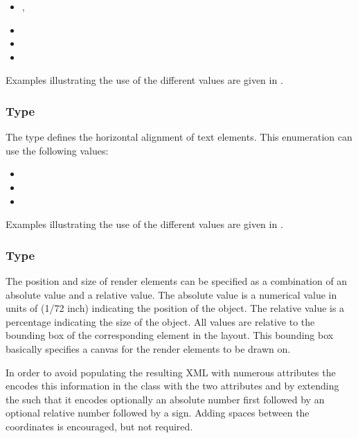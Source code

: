 \begin{itemize}
 \item {},
 \item {}
 \item {} 
 \item {}
\end{itemize}

Examples illustrating the use of the different \VTextAnchor values are given in .

\subsubsection{Type \fixttspace{}}

The type \HTextAnchor defines the horizontal alignment of text elements. This enumeration can use the following values: 

\begin{itemize}
 \item {}
 \item {}
 \item {}
\end{itemize}

Examples illustrating the use of the different \HTextAnchor values are given in .



\subsubsection{Type \fixttspace{}}

The position and size of render elements can be specified as a combination of an absolute value and a relative value. The absolute value is a numerical value in units of  (1/72 inch) indicating the position of the object. The relative value is a percentage indicating the size of the object. All values are relative to the bounding box of the corresponding element in the layout. This bounding box basically specifies a canvas for the render elements to be drawn on.

In order to avoid populating the resulting XML with numerous attributes the \RenderPackage encodes this information in the \RelAbsVector class with the two attributes  and  by extending the  such that it encodes optionally an absolute number first followed by an optional 
relative number followed by a \token{\%} sign. Adding spaces between the coordinates is encouraged, but not required.

